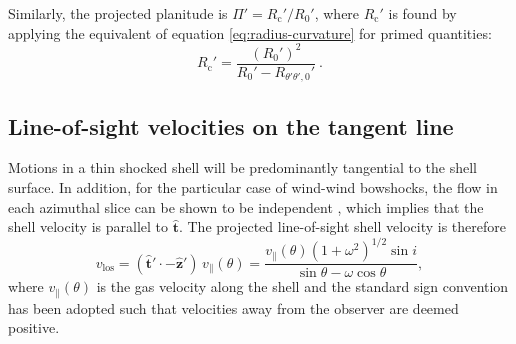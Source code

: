 \documentclass[useAMS, usenatbib, a4paper]{mnras}
\newcommand\C{\ensuremath{\mathrm{c}}}
\newcommand\uvec[1]{\bm{\hat{#1}}}
\begin{document}
Similarly, the projected planitude is \(\Pi' = R_{\C}' / R_0'\), where
\(R_{\C}'\) is found by applying the equivalent of equation
\eqref{eq:radius-curvature} for primed quantities:
\begin{equation}
  \label{eq:projected-radius-curvature}
  R_{\C}' 
  = \frac{(R_0')^2}{R_0' - R_{\theta'\theta',0}'} \ .
\end{equation}


\subsection{Line-of-sight velocities on the tangent line}
\label{sec:line-sight-veloc}
Motions in a thin shocked shell will be predominantly tangential to
the shell surface. In addition, for the particular case of wind-wind
bowshocks, the flow in each azimuthal slice can be shown to be
independent \citep{Wilkin:2000a}, which implies that the shell
velocity is parallel to \(\uvec{t}\). The projected line-of-sight
shell velocity is therefore
  \begin{equation}
    \label{eq:vlos}
    v_{\mathrm{los}} = (\uvec{t}' \cdot -\uvec{z}') \, v_{\parallel}(\theta) = \frac{v_{\parallel}(\theta) (1+\omega^2)^{1/2} \sin i }{\sin\theta - \omega\cos\theta} ,
  \end{equation}
  where \( v_{\parallel}(\theta)\) is the gas velocity along the shell and the standard sign convention has been adopted such that velocities away from the observer are deemed positive. 



\newcommand{\Q}{\ensuremath{\mathcal{Q}}}
\newcommand{\thetaQ}{\ensuremath{\theta_{\scriptscriptstyle \Q}}}
\end{document}
